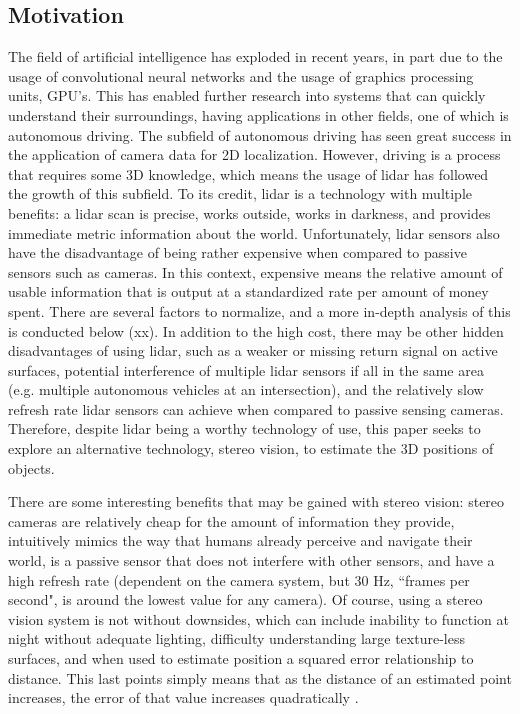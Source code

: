 \subsection{Motivation}
The field of artificial intelligence has exploded in recent years, in part due to the usage of convolutional neural networks and the usage of graphics processing units, GPU's. This has enabled further research into systems that can quickly understand their surroundings, having applications in other fields, one of which is autonomous driving. The subfield of autonomous driving has seen great success in the application of camera data for 2D localization. However, driving is a process that requires some 3D knowledge, which means the usage of lidar has followed the growth of this subfield. To its credit, lidar is a technology with multiple benefits: a lidar scan is precise, works outside, works in darkness, and provides immediate metric information about the world. Unfortunately, lidar sensors also have the disadvantage of being rather expensive when compared to passive sensors such as cameras. In this context, expensive means the relative amount of usable information that is output at a standardized rate per amount of money spent. There are several factors to normalize, and a more in-depth analysis of this is conducted below (xx). In addition to the high cost, there may be other hidden disadvantages of using lidar, such as a weaker or missing return signal on active surfaces, potential interference of multiple lidar sensors if all in the same area (e.g. multiple autonomous vehicles at an intersection), and the relatively slow refresh rate lidar sensors can achieve when compared to passive sensing cameras. Therefore, despite lidar being a worthy technology of use, this paper seeks to explore an alternative technology, stereo vision, to estimate the 3D positions of objects.


There are some interesting benefits that may be gained with stereo vision: stereo cameras are relatively cheap for the amount of information they provide, intuitively mimics the way that humans already perceive and navigate their world, is a passive sensor that does not interfere with other sensors, and have a high refresh rate (dependent on the camera system, but 30 Hz, ``frames per second", is around the lowest value for any camera). Of course, using a stereo vision system is not without downsides, which can include inability to function at night without adequate lighting, difficulty understanding large texture-less surfaces, and when used to estimate position a squared error relationship to distance. This last points simply means that as the distance of an estimated point increases, the error of that value increases quadratically \cite{wang_pseudo-lidar_2019}.


